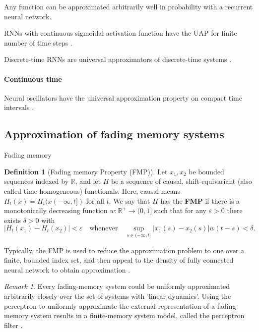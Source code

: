 \documentclass{article}
\theoremstyle{definition}
\newtheorem{definition}{Definition}
\theoremstyle{remark}
\newtheorem{remark}{Remark}
\begin{document}
Any function can be approximated arbitrarily well in probability with a recurrent neural network\citep{hammer2000approximation}. 


RNNs with continuous sigmoidal activation function have the UAP for finite number of time steps \citep{schafer2007}.

Discrete-time RNNs are universal approximators of discrete-time systems \citep{aguiar2023universal}.

\paragraph{Continuous time}
Neural oscillators have the universal approximation property on compact time intervals \citep{lanthaler2023neuraloscillators}.



\subsection{Approximation of fading memory systems}
Fading memory \citep{boyd1985fading}


\begin{definition}[Fading memory Property (FMP)]
Let $x_1, x_2$ be bounded sequences indexed by $\mathbb{R}$, and let $H$ be a sequence of causal, shift-equivariant (also called time-homogeneous) functionals.
Here, causal means $H_t(x) = H_t(x(-\infty,t])$ for all $t$.
We say that $H$ has the \textbf{FMP} if there is a monotonically decreasing function $w : \mathbb{R}^+ \to (0, 1]$ such that for any $\varepsilon > 0$ there exists $\delta > 0$ with 
\[
|H_t(x_1) - H_t(x_2)| < \varepsilon \quad \text{whenever} \quad \sup_{s \in (-\infty, t]} |x_1(s) - x_2(s)| w(t - s) < \delta.
\]
\end{definition}

 Typically, the FMP is used to reduce the approximation problem to one over a finite, bounded index set, and then appeal to the density of fully connected neural network to obtain approximation \citep{gonon2021fading}. %


\begin{remark}
Every fading-memory system could be uniformly approximated arbitrarily closely over the set of systems with 'linear dynamics'\citep{matthews1993approximating}. %
Using the perceptron to uniformly approximate the external representation of a fading-memory system results in a finite-memory system model, called the perceptron filter \citep{matthews1993approximating}.
\end{remark}
\end{document}
